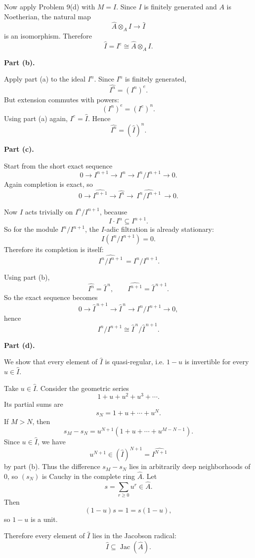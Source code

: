 \documentclass[12pt,a4paper]{article}
\theoremstyle{plain}
\theoremstyle{definition}      %
\begin{document}
	Now apply Problem 9(d) with \(M=I\). Since \(I\) is finitely generated and \(A\) is Noetherian, the natural map
	\[
	\widehat A\otimes_A I \longrightarrow \widehat I
	\]
	is an isomorphism. Therefore
	\[
	\widehat I = I^e \cong \widehat A\otimes_A I.
	\]
	
	\medskip
	\textbf{Part (b).}
	
	Apply part (a) to the ideal \(I^n\). Since \(I^n\) is finitely generated,
	\[
	\widehat{I^n} = (I^n)^e.
	\]
	But extension commutes with powers:
	\[
	(I^n)^e = (I^e)^n.
	\]
	Using part (a) again, \(I^e=\widehat I\). Hence
	\[
	\widehat{I^n} = (\widehat I)^n.
	\]
	
	\medskip
	\textbf{Part (c).}
	
	Start from the short exact sequence
	\[
	0 \to I^{n+1} \to I^n \to I^n/I^{n+1} \to 0.
	\]
	Again completion is exact, so
	\[
	0 \to \widehat{I^{n+1}} \to \widehat{I^n} \to \widehat{\,I^n/I^{n+1}\,} \to 0.
	\]
	
	Now \(I\) acts trivially on \(I^n/I^{n+1}\), because
	\[
	I\cdot I^n \subseteq I^{n+1}.
	\]
	So for the module \(I^n/I^{n+1}\), the \(I\)-adic filtration is already stationary:
	\[
	I(I^n/I^{n+1})=0.
	\]
	Therefore its completion is itself:
	\[
	\widehat{\,I^n/I^{n+1}\,}=I^n/I^{n+1}.
	\]
	
	Using part (b),
	\[
	\widehat{I^n}=\widehat I^{\,n},
	\qquad
	\widehat{I^{n+1}}=\widehat I^{\,n+1}.
	\]
	So the exact sequence becomes
	\[
	0 \to \widehat I^{\,n+1} \to \widehat I^{\,n} \to I^n/I^{n+1} \to 0,
	\]
	hence
	\[
	I^n/I^{n+1} \cong \widehat I^{\,n}/\widehat I^{\,n+1}.
	\]
	
	\medskip
	\textbf{Part (d).}
	
	We show that every element of \(\widehat I\) is quasi-regular, i.e. \(1-u\) is invertible for every \(u\in \widehat I\).
	
	Take \(u\in \widehat I\). Consider the geometric series
	\[
	1+u+u^2+u^3+\cdots.
	\]
	Its partial sums are
	\[
	s_N = 1+u+\cdots+u^N.
	\]
	If \(M>N\), then
	\[
	s_M-s_N = u^{N+1}(1+u+\cdots+u^{M-N-1}).
	\]
	Since \(u\in \widehat I\), we have
	\[
	u^{N+1}\in (\widehat I)^{N+1}=\widehat{I^{N+1}}
	\]
	by part (b). Thus the difference \(s_M-s_N\) lies in arbitrarily deep neighborhoods of \(0\), so \((s_N)\) is Cauchy in the complete ring \(\widehat A\). Let
	\[
	s=\sum_{r\ge 0}u^r\in \widehat A.
	\]
	Then
	\[
	(1-u)s=1=s(1-u),
	\]
	so \(1-u\) is a unit.
	
	Therefore every element of \(\widehat I\) lies in the Jacobson radical:
	\[
	\widehat I \subseteq \operatorname{Jac}(\widehat A).
	\]
	
\end{document}
